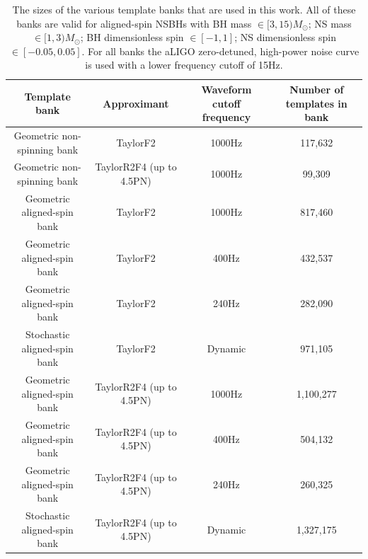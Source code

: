 \begin{table}
    \centering
    \begin{minipage}[l]{\columnwidth}
    \centering
    \begin{adjustbox}{width=1\textwidth}
\begin{tabular}{c | c | c | c}
 Template bank & Approximant & Waveform cutoff frequency & Number of templates
in bank \\ \hline \hline
 Geometric non-spinning bank & TaylorF2 & 1000Hz & 117,632 \\
 Geometric non-spinning bank & TaylorR2F4 (up to 4.5PN) & 1000Hz & 99,309 \\
 Geometric aligned-spin bank & TaylorF2 & 1000Hz & 817,460 \\
 Geometric aligned-spin bank & TaylorF2 & 400Hz & 432,537 \\
 Geometric aligned-spin bank & TaylorF2 & 240Hz & 282,090 \\
 Stochastic aligned-spin bank & TaylorF2 & Dynamic & 971,105 \\
 Geometric aligned-spin bank & TaylorR2F4 (up to 4.5PN) & 1000Hz & 1,100,277 \\
 Geometric aligned-spin bank & TaylorR2F4 (up to 4.5PN) & 400Hz & 504,132 \\
 Geometric aligned-spin bank & TaylorR2F4 (up to 4.5PN) & 240Hz & 260,325 \\
 Stochastic aligned-spin bank & TaylorR2F4 (up to 4.5PN) & Dynamic & 1,327,175\\
\end{tabular}
\end{adjustbox}
\caption{\label{tab:banksizes}
The sizes of the various template banks that are used in this work. All of these
banks are valid for
aligned-spin \acp{NSBH} with BH mass $\in [3,15) M_{\odot}$; NS mass $\in 
[1,3)M_{\odot}$; BH
dimensionless spin $\in [-1,1]$;
NS dimensionless spin $\in [-0.05,0.05]$. For all banks the \ac{aLIGO}
zero-detuned, high-power noise curve is used with a lower frequency cutoff of
15Hz.
}
\end{minipage}
\end{table}

